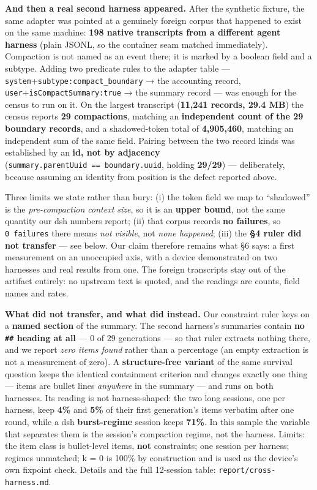 \documentclass[
]{article}
\newcounter{none} %
\begin{document}
\textbf{And then a real second harness appeared.} After the synthetic
fixture, the same adapter was pointed at a genuinely foreign corpus that
happened to exist on the same machine: \textbf{198 native transcripts
from a different agent harness} (plain JSONL, so the container seam
matched immediately). Compaction is not named as an event there; it is
marked by a boolean field and a subtype. Adding two predicate rules to
the adapter table ---
\texttt{system}+\texttt{subtype:\textquotesingle{}compact\_boundary\textquotesingle{}}
→ the accounting record, \texttt{user}+\texttt{isCompactSummary:true} →
the summary record --- was enough for the census to run on it. On the
largest transcript (\textbf{11,241 records, 29.4 MB}) the census reports
\textbf{29 compactions}, matching an \textbf{independent count of the 29
boundary records}, and a shadowed-token total of \textbf{4,905,460},
matching an independent sum of the same field. Pairing between the two
record kinds was established by an \textbf{id, not by adjacency}
(\texttt{summary.parentUuid\ ==\ boundary.uuid}, holding \textbf{29/29})
--- deliberately, because assuming an identity from position is the
defect reported above.

Three limits we state rather than bury: (i) the token field we map to
``shadowed'' is the \emph{pre-compaction context size}, so it is an
\textbf{upper bound}, not the same quantity our dsh numbers report; (ii)
that corpus records \textbf{no failures}, so \texttt{0\ failures} there
means \emph{not visible}, not \emph{none happened}; (iii) the \textbf{§4
ruler did not transfer} --- see below. Our claim therefore remains what
§6 says: a first measurement on an unoccupied axis, with a device
demonstrated on two harnesses and real results from one. The foreign
transcripts stay out of the artifact entirely: no upstream text is
quoted, and the readings are counts, field names and rates.

\textbf{What did not transfer, and what did instead.} Our constraint
ruler keys on a \textbf{named section} of the summary. The second
harness's summaries contain \textbf{no \texttt{\#\#} heading at all} ---
0 of 29 generations --- so that ruler extracts nothing there, and we
report \emph{zero items found} rather than a percentage (an empty
extraction is not a measurement of zero). A \textbf{structure-free
variant} of the same survival question keeps the identical containment
criterion and changes exactly one thing --- items are bullet lines
\emph{anywhere} in the summary --- and runs on both harnesses. Its
reading is not harness-shaped: the two long sessions, one per harness,
keep \textbf{4\%} and \textbf{5\%} of their first generation's items
verbatim after one round, while a dsh \textbf{burst-regime} session
keeps \textbf{71\%}. In this sample the variable that separates them is
the session's compaction regime, not the harness. Limits: the item class
is bullet-level items, \textbf{not} constraints; one session per
harness; regimes unmatched; k = 0 is 100\% by construction and is used
as the device's own fixpoint check. Details and the full 12-session
table: \texttt{report/cross-harness.md}.
\end{document}
